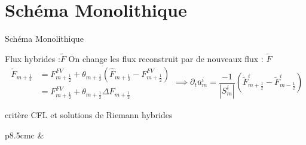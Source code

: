 
\section{Schéma Monolithique}

\begin{frame}{Schéma Monolithique}

\begin{block}{Flux hybrides :$\widetilde{F}$}
On change les flux reconstruit par de nouveaux flux : $\widetilde{F}$
\begin{equation*}
\begin{aligned}
\widetilde{F}_{m+\frac{1}{2}} &=  F^{FV}_{m+\frac{1}{2}} + \theta_{m+\frac{1}{2}} (\widehat{F}_{m+\frac{1}{2}} -F^{FV}_{m+\frac{1}{2}})\\
&=  F^{FV}_{m+\frac{1}{2}} + \theta_{m+\frac{1}{2}} \Delta F_{m+\frac{1}{2}} 
\end{aligned}
\implies
\partial_t \overline{u}^i_m = \frac{-1}{|S_m^i|} (\widetilde{F}^i_{m+\frac{1}{2}}-\widetilde{F}^i_{m-\frac{1}{2}})
\end{equation*}
\end{block}

\begin{block}{critère CFL et solutions de Riemann hybrides}
\begin{tabular}{p{8.5cm}c}
&
\raisebox{-30mm}{\usebox{\SRiemann}}
\end{tabular}   
\end{block}

\end{frame}


